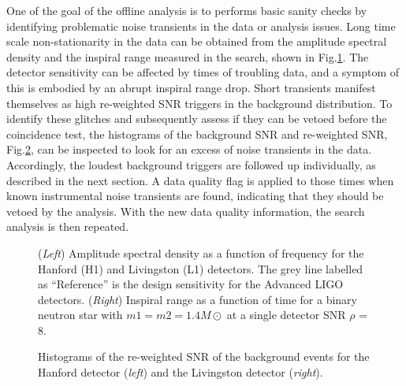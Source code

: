 \documentclass[binding=0.6cm, LaM]{sapthesis}
\begin{document}
	One of the goal of the offline analysis is to performs basic sanity checks 
	by identifying problematic noise transients in the data or analysis issues.
	Long time scale non-stationarity in the data can be obtained from the amplitude spectral density 
	and the inspiral range measured in the search, shown in  Fig.\ref{fig:asd}.
	The detector sensitivity can be affected by times of troubling data, 
	and a symptom of this is embodied  by  an abrupt inspiral range drop.
	Short transients manifest themselves as high re-weighted SNR triggers in the background distribution. 
	To identify these glitches and subsequently  assess if they can be vetoed before the coincidence test, 
	the histograms of the background SNR and re-weighted SNR, Fig.\ref{fig:snrhistogram}, 
	can be inspected to look for an excess of noise transients in the data.
	Accordingly, the loudest background triggers are followed up individually, 
	as described in the next section.
	A data quality flag is applied to those times when known instrumental noise transients are found, 
	indicating that they should be vetoed by the analysis. 
	With the new data quality information, the search analysis is then repeated.
        \begin{figure}[!t]
          \noindent
          \label{asd}
          \centering
          \caption{(\textit{Left}) Amplitude spectral density as a function of frequency for the Hanford (H1) and Livingston (L1) detectors. The grey line labelled as “Reference” is the design sensitivity for the Advanced LIGO detectors. (\textit{Right}) Inspiral range as a function of time for a binary neutron star with $m1 = m2 = 1.4 M\odot$ at a single detector SNR $\rho$ = 8.}
          \label{fig:asd}
        \end{figure}
        
        \begin{figure}[!t]
          \noindent
          \label{snrhistogram}
          \centering
          \caption{Histograms of the re-weighted SNR of the background events for the Hanford detector (\textit{left}) and the Livingston detector (\textit{right}).}
          \label{fig:snrhistogram}
        \end{figure}
\end{document}
